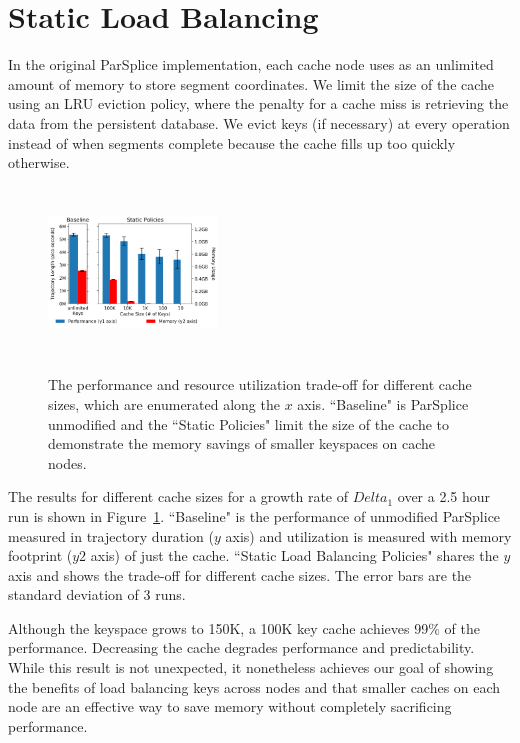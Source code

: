 \section{Static Load Balancing}
\label{sec:static-load-balancing}

In the original ParSplice implementation, each cache node uses as an unlimited
amount of memory to store segment coordinates. We limit the size of the cache
using an LRU eviction policy, where the penalty for a cache miss is retrieving
the data from the persistent database.  We evict keys (if necessary) at every
operation instead of when segments complete because the cache fills up too
quickly otherwise.

\begin{figure}[t]
  \noindent\includegraphics[height=4.5cm,width=0.4\textwidth]{figures/methodology-tradeoff.png}\\
  \caption{The performance and resource utilization trade-off for different
  cache sizes, which are enumerated along the \(x\) axis. ``Baseline" is
  ParSplice unmodified and the ``Static  Policies" limit the size of the
  cache to demonstrate the memory savings of smaller keyspaces on cache nodes.
  \label{fig:methodology-tradeoff}}
\end{figure}

The results for different cache sizes for a growth rate of \(Delta_1\) over a 2.5 hour
run is shown in Figure~\ref{fig:methodology-tradeoff}.  ``Baseline" is the
performance of unmodified ParSplice  measured in trajectory duration
(\(y\) axis) and utilization is measured with memory footprint (\(y2\) axis) of
just the cache.  ``Static Load Balancing Policies" shares the \(y\) axis and
shows the trade-off for different cache sizes. The error bars are the standard
deviation of 3 runs. 

Although the keyspace grows to 150K, a 100K key cache achieves 99\% of the
performance. Decreasing the cache degrades performance and predictability.
While this result is not unexpected, it nonetheless achieves our goal of
showing the benefits of load balancing keys across nodes and that smaller
caches on each node are an effective way to save memory without completely
sacrificing performance.
